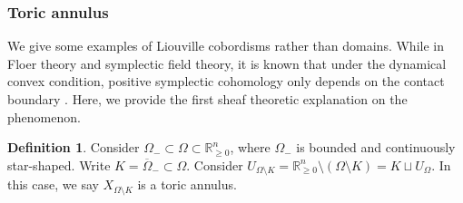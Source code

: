 \documentclass[11pt]{amsart}
\numberwithin{equation}{section}
\theoremstyle{plain}
\theoremstyle{definition}
\newtheorem{Def}[def]{Definition}
\theoremstyle{remark}
\newcommand{\bR} { {\mathbb{R}}}
\begin{document}
\subsubsection{Toric annulus}
We give some examples of Liouville cobordisms rather than domains. While in Floer theory and symplectic field theory, it is known that under the dynamical convex condition, positive symplectic cohomology only depends on the contact boundary \cite{HoferWysockiZehnder,Cieliebak-Oancea-ES,Bourgeois-Oancea-17,HutchingsNelson}. Here, we provide the first sheaf theoretic explanation on the phenomenon.

\begin{Def}Consider $\Omega_-\subset \Omega  \subset \bR^n_{\geq 0}$, where $\Omega_-$ is bounded and continuously star-shaped. Write $ K=\overline{\Omega}_-\subset \Omega$. Consider $U_{\Omega \setminus K}= \bR^n_{\geq 0}\setminus (\Omega\setminus K)=K\sqcup U_{\Omega}$. In this case, we say $X_{\Omega\setminus K}$ is a toric annulus.
\end{Def}
\end{document}
